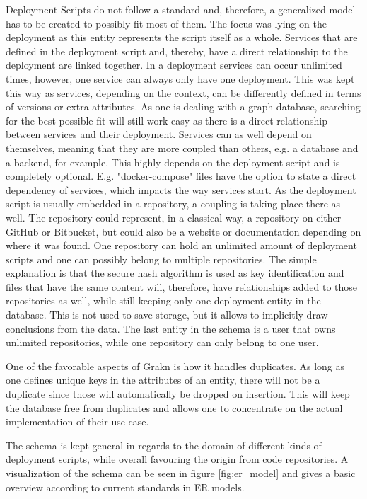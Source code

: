 Deployment Scripts do not follow a standard and, therefore, a generalized model has to be created to possibly fit most of them. The focus was lying on the deployment as this entity represents the script itself as a whole. Services that are defined in the deployment script and, thereby, have a direct relationship to the deployment are linked together. In a deployment services can occur unlimited times, however, one service can always only have one deployment. This was kept this way as services, depending on the context, can be differently defined in terms of versions or extra attributes. As one is dealing with a graph database, searching for the best possible fit will still work easy as there is a direct relationship between services and their deployment.
Services can as well depend on themselves, meaning that they are more coupled than others, e.g. a database and a backend, for example. This highly depends on the deployment script and is completely optional. E.g. "docker-compose" files have the option to state a direct dependency of services, which impacts the way services start.
As the deployment script is usually embedded in a repository, a coupling is taking place there as well. The repository could represent, in a classical way, a repository on either GitHub or Bitbucket, but could also be a website or documentation depending on where it was found. One repository can hold an unlimited amount of deployment scripts and one can possibly belong to multiple repositories. The simple explanation is that the secure hash algorithm is used as key identification and files that have the same content will, therefore, have relationships added to those repositories as well, while still keeping only one deployment entity in the database. This is not used to save storage, but it allows to implicitly draw conclusions from the data. The last entity in the schema is a user that owns unlimited repositories, while one repository can only belong to one user.

One of the favorable aspects of Grakn is how it handles duplicates. As long as one defines unique keys in the attributes of an entity, there will not be a duplicate since those will automatically be dropped on insertion. This will keep the database free from duplicates and allows one to concentrate on the actual implementation of their use case.

The schema is kept general in regards to the domain of different kinds of deployment scripts, while overall favouring the origin from code repositories. A visualization of the schema can be seen in figure \ref{fig:er_model} and gives a basic overview according to current standards in ER models.

